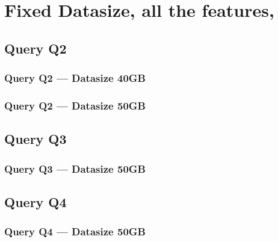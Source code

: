 \newpage
\section{Fixed Datasize, all the features,}
\subsection{Query Q2}
\subsubsection{Query Q2 --- Datasize 40GB}



\newpage
\subsubsection{Query Q2 --- Datasize 50GB}



\newpage

\subsection{Query Q3}
\subsubsection{Query Q3 --- Datasize 50GB}



\newpage

\subsection{Query Q4}
\subsubsection{Query Q4 --- Datasize 50GB}



\newpage

